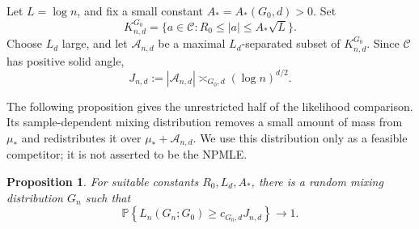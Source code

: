 \documentclass[11pt]{article}
\newtheorem{proposition}[theorem]{Proposition}
\theoremstyle{definition}
\numberwithin{equation}{section}
\begin{document}
Let \(L=\log n\), and fix a small constant \(A_*=A_*(G_0,d)>0\). Set
\[
    K_{n,d}^{G_0}
    =
    \{a\in\mathcal C:R_0\le |a|\le A_*\sqrt L\}.
\]
Choose \(L_d\) large, and let \(\mathcal A_{n,d}\) be a maximal \(L_d\)-separated subset of \(K_{n,d}^{G_0}\). Since \(\mathcal C\) has positive solid angle,
\[
    J_{n,d}:=|\mathcal A_{n,d}|\asymp_{G_0,d}(\log n)^{d/2}.
\]

The following proposition gives the unrestricted half of the likelihood
comparison. Its sample-dependent mixing distribution removes a small amount
of mass from \(\mu_*\) and redistributes it over
\(\mu_*+\mathcal A_{n,d}\). We use this distribution only as a feasible
competitor; it is not asserted to be the NPMLE.

\begin{proposition}
\label{prop:gaussian-finite-constructive}
For suitable constants \(R_0,L_d,A_*\), there is a random mixing distribution \(G_n\) such that
\[
    \mathbb P\left\{
        L_n(G_n;G_0)
        \ge c_{G_0,d}J_{n,d}
    \right\}\to1.
\]
\end{proposition}
\end{document}
